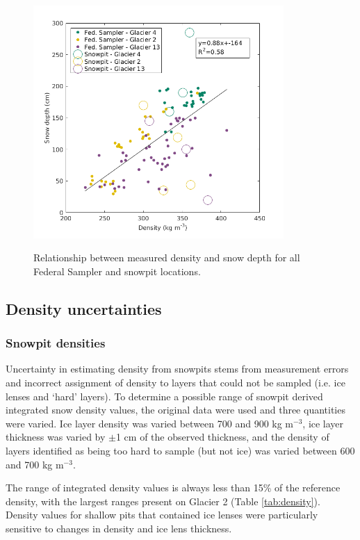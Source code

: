 \documentclass[12pt]{article}
\begin{document}
\begin{figure}[p]
	\centering
	\includegraphics[width =0.85\textwidth]{DepthDensity_SWEonly.png}\\
	\caption{Relationship between measured density and snow depth for all Federal Sampler and snowpit locations.}
	\label{fig:all_depth}
\end{figure}


\subsection{Density uncertainties}

\subsubsection{Snowpit densities}

Uncertainty in estimating density from snowpits stems from measurement errors and incorrect assignment of density to layers that could not be sampled (i.e. ice lenses and `hard' layers). To determine a possible range of snowpit derived integrated snow density values, the original data were used and three quantities were varied. Ice layer density was varied between 700 and 900 kg m$^{-3}$, ice layer thickness was varied by $\pm$1 cm of the observed thickness, and the density of layers identified as being too hard to sample (but not ice) was varied between 600 and 700 kg m$^{-3}$. 

The range of integrated density values is always less than 15\% of the reference density, with the largest ranges present on Glacier 2 (Table \ref{tab:density}). Density values for shallow pits that contained ice lenses were particularly sensitive to changes in density and ice lens thickness. 
\end{document}
